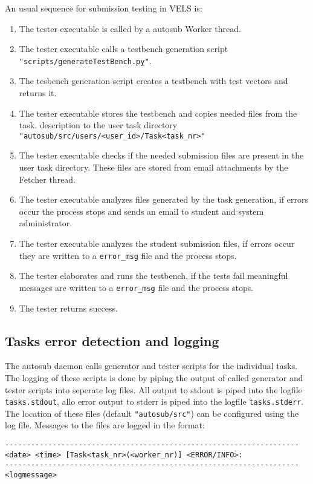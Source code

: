 An usual sequence for submission testing in VELS is:
\begin{enumerate}
\item The tester executable is called by a autosub Worker thread.
\item The tester executable calls a testbench generation script
    {\tt "scripts/generateTestBench.py"}.
\item The tesbench generation script creates a testbench with test vectors and returns it.
\item The tester executable stores the testbench and copies needed files from the task.
    description to the user task directory {\tt "autosub/src/users/<user\_id>/Task<task\_nr>"}
\item The tester executable checks if the needed submission files are present in the
	user task directory. These files are stored from email attachments by the Fetcher thread.
\item The tester executable analyzes files generated by the task generation, if errors
    occur the process stops and sends an email to student and system administrator.
\item The tester executable analyzes the student submission files, if errors occur they
    are written to a {\tt error\_msg} file and the process stops.
\item The tester elaborates and runs the testbench, if the tests fail meaningful messages
    are written to a {\tt error\_msg} file and the process stops.
\item The tester returns success.
\end{enumerate}

\subsection{Tasks error detection and logging} \label{tasklog}
The autosub daemon calls generator and tester scripts for the individual tasks. The logging 
of these scripts is done by piping the output of called generator and tester scripts into 
seperate log files. All output to stdout is piped into the logfile {\tt tasks.stdout}, allo 
error output to stderr is piped into the logfile {\tt tasks.stderr}. The location of these
files (default {\tt "autosub/src"}) can be configured using the log file. Messages to the 
files are logged in the format:
\begin{verbatim}
--------------------------------------------------------------------
<date> <time> [Task<task_nr>(<worker_nr)] <ERROR/INFO>:
--------------------------------------------------------------------
<logmessage>
\end{verbatim}

